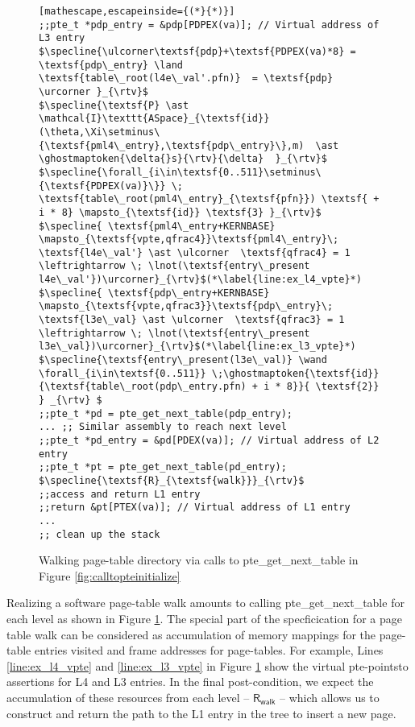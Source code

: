 \begin{figure}
\begin{lstlisting}[mathescape,escapeinside={(*}{*)}]
;;pte_t *pdp_entry = &pdp[PDPEX(va)]; // Virtual address of L3 entry
$\specline{\ulcorner\textsf{pdp}+\textsf{PDPEX(va)*8} = \textsf{pdp\_entry} \land \textsf{table\_root(l4e\_val'.pfn)}  = \textsf{pdp} \urcorner }_{\rtv}$
$\specline{\textsf{P} \ast \mathcal{I}\texttt{ASpace}_{\textsf{id}}(\theta,\Xi\setminus\{\textsf{pml4\_entry},\textsf{pdp\_entry}\},m)  \ast \ghostmaptoken{\delta{}s}{\rtv}{\delta}  }_{\rtv}$
$\specline{\forall_{i\in\textsf{0..511}\setminus\{\textsf{PDPEX(va)}\}} \; \textsf{table\_root(pml4\_entry}_{\textsf{pfn}}) \textsf{ + i * 8} \mapsto_{\textsf{id}} \textsf{3} }_{\rtv}$
$\specline{ \textsf{pml4\_entry+KERNBASE} \mapsto_{\textsf{vpte,qfrac4}}\textsf{pml4\_entry}\; \textsf{l4e\_val'} \ast \ulcorner  \textsf{qfrac4} = 1 \leftrightarrow \; \lnot(\textsf{entry\_present l4e\_val'})\urcorner}_{\rtv}$(*\label{line:ex_l4_vpte}*)
$\specline{ \textsf{pdp\_entry+KERNBASE} \mapsto_{\textsf{vpte,qfrac3}}\textsf{pdp\_entry}\; \textsf{l3e\_val} \ast \ulcorner  \textsf{qfrac3} = 1 \leftrightarrow \; \lnot(\textsf{entry\_present l3e\_val})\urcorner}_{\rtv}$(*\label{line:ex_l3_vpte}*)
$\specline{\textsf{entry\_present(l3e\_val)} \wand \forall_{i\in\textsf{0..511}} \;\ghostmaptoken{\textsf{id}}{\textsf{table\_root(pdp\_entry.pfn) + i * 8}}{ \textsf{2}} } _{\rtv} $
;;pte_t *pd = pte_get_next_table(pdp_entry);
... ;; Similar assembly to reach next level
;;pte_t *pd_entry = &pd[PDEX(va)]; // Virtual address of L2 entry
;;pte_t *pt = pte_get_next_table(pd_entry);
$\specline{\textsf{R}_{\textsf{walk}}}_{\rtv}$
;;access and return L1 entry
;;return &pt[PTEX(va)]; // Virtual address of L1 entry
...
;; clean up the stack 
\end{lstlisting}
\fi
\vspace{-1em}
\caption{Walking page-table directory via calls to \textsf{pte\_get\_next\_table} in Figure \ref{fig:calltopteinitialize}}
\label{walkpgdir}
\vspace{-1em}
\end{figure}

Realizing a software page-table walk amounts to calling \textsf{pte\_get\_next\_table} for each level as shown in Figure \ref{walkpgdir}. 
The special part of the specficication for a page table walk can be considered as accumulation of memory mappings for the page-table entries 
visited and frame addresses for page-tables. 
For example, Lines \ref{line:ex_l4_vpte} and \ref{line:ex_l3_vpte} in Figure \ref{walkpgdir} show the virtual pte-pointsto assertions for L4 and L3 entries.
In the final post-condition, we expect the accumulation of these resources from each level -- $\textsf{R}_{\textsf{walk}}$ -- 
which allows us to construct and return the path to the L1 entry in the tree to insert a new page.  

